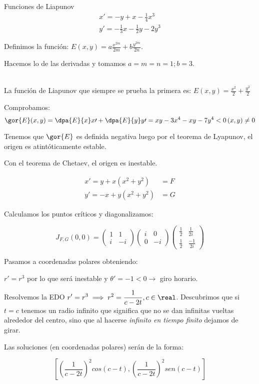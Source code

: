\documentclass[nochap]{apuntes}
\begin{document}
\begin{problem}[8]
Funciones de Liapunov
\solution
\spart[1]
\[\begin{array}{cc}
x\prime = -y + x -\frac{1}{4}x^3\\
y\prime = -\frac{1}{3}x-\frac{1}{2}y - 2y^3
\end{array}\]

Definimos la función: $\displaystyle E(x,y) = a\frac{x^{2m}}{2m} + b\frac{y^{2m}}{2n}$.

Hacemos lo de las derivadas y tomamos $a=m=n=1; b=3$.

\spart[2]
\[\begin{array}{cc}
\end{array}\]

La función de Liapunov que siempre se prueba la primera es: $E(x,y) = \displaystyle \frac{x^2}{2} + \frac{y^2}{2}$

Comprobamos: \[\gor{E}(x,y) = \dpa{E}{x}x\prime + \dpa{E}{y}y\prime = xy - 3x^4 - xy - 7y^4 < 0 \, (x,y)\neq 0\]

Tenemos que $\gor{E}$ es definida negativa luego por el teorema de Lyapunov, el origen es atintóticamente estable.

\spart[3]
Con el teorema de Chetaev, el origen es inestable.
\end{problem}
\begin{problem}[11]
\[\begin{array}{cc}
x'=y+x(x^2+y^2) &= F\\
y' = -x+y(x^2+y^2) &= G
\end{array}\]

\solution
Calculamos los puntos críticos y diagonalizamos:

\[J_{F,G}(0,0) = \begin{pmatrix}
1&1\\i&-i
\end{pmatrix}\begin{pmatrix}
i&0\\0&-i
\end{pmatrix}\begin{pmatrix}
\frac{1}{2}&\frac{1}{2i}\\\frac{1}{2}&\frac{-1}{2i}
\end{pmatrix}\]

Pasamos a coordenadas polares obteniendo:

$r' = r^3$ por lo que será inestable y $ \theta' = -1 < 0\to$ giro horario.

Resolvemos la EDO $\displaystyle r'=r^3 \implies r^2 = \frac{1}{c-2t},c\in\real$. Descubrimos que si $t = c$ tenemos un radio infinito que significa que no se dan infinitas vueltas alrededor del centro, sino que al hacerse \textit{infinito en tiempo finito} dejamos de girar.

Las soluciones (en coordenadas polares) serán de la forma:

\[\left[\left(\frac{1}{c-2t}\right)^2cos(c-t),\left(\frac{1}{c-2t}\right)^2sen(c-t)\right]\]

\end{problem}
\end{document}
